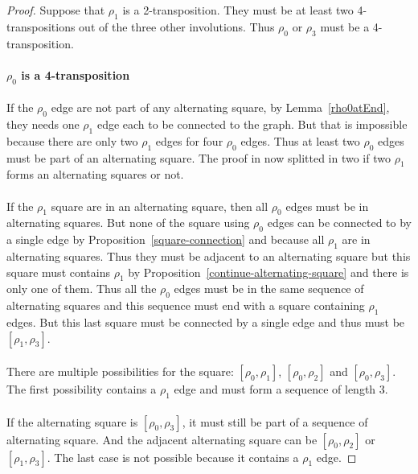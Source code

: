 \begin{proof}
  Suppose that $\rho_1$ is a 2-transposition. They must be at least two 4-transpositions out of the three other involutions. Thus $\rho_0$ or $\rho_3$ must be a 4-transposition.

  \paragraph{}
  \textbf{$\rho_0$ is a 4-transposition}

  \paragraph{}
  If the $\rho_0$ edge are not part of any alternating square, by Lemma~\ref{rho0atEnd}, they needs one $\rho_1$ edge each to be connected to the graph. But that is impossible because there are only two $\rho_1$ edges for four $\rho_0$ edges. Thus at least two $\rho_0$ edges must be part of an alternating square. The proof in now splitted in two if two $\rho_1$ forms an alternating squares or not.

  \paragraph{}
  If the $\rho_1$ square are in an alternating square, then all $\rho_0$ edges must be in alternating squares. But none of the square using $\rho_0$ edges can be connected to by a single edge by Proposition~\ref{square-connection} and because all $\rho_1$ are in alternating squares. Thus they must be adjacent to an alternating square but this square must contains $\rho_1$ by Proposition~\ref{continue-alternating-square} and there is only one of them. Thus all the $\rho_0$ edges must be in the same sequence of alternating squares and this sequence must end with a square containing $\rho_1$ edges. But this last square must be connected by a single edge and thus must be $[\rho_1, \rho_3]$.


  \paragraph{}
  There are multiple possibilities for the square: $[\rho_0, \rho_1]$, $[\rho_0, \rho_2]$ and $[\rho_0, \rho_3]$. The first possibility contains a $\rho_1$ edge and must form a sequence of length 3.

  \paragraph{}
  If the alternating square is $[\rho_0, \rho_3]$, it must still be part of a sequence of alternating square. And the adjacent alternating square can be $[\rho_0, \rho_2]$ or $[\rho_1, \rho_3]$. The last case is not possible because it contains a $\rho_1$ edge.


\end{proof}
